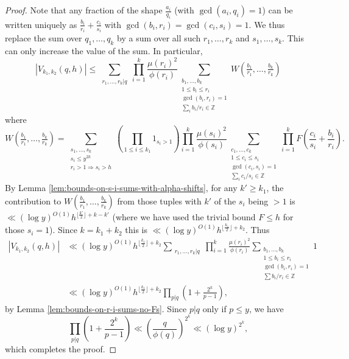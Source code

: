 \documentclass[11pt,letterpaper]{amsart}
\newcommand{\brac}[1]{\left( #1\right)}
\newcommand{\subsum}[1]{\sum_{\substack{#1}}}
\newcommand{\ogcd}[2]{\gcd(#1,#2)}
\theoremstyle{definition}
\begin{document}
\begin{proof}
Note that any fraction of the shape $\frac{a_i}{q_i}$ (with $\ogcd{a_i}{q_i}=1$) can be written uniquely as $\frac{b_i}{r_i}+\frac{c_i}{s_i}$ with $\ogcd{b_i}{r_i}=\ogcd{c_i}{s_i}=1$. We thus replace the sum over $q_1, \dots, q_k$ by a sum over all such $r_1, \dots, r_k$ and $s_1, \dots, s_k$. This can only increase the value of the sum. In particular,
\[|V_{k_1,k_2}(q,h)| \le \subsum{r_1, \dots, r_k|q} \prod_{i=1}^k \frac{\mu(r_i)^2}{\phi(r_i)}\subsum{b_1, \dots, b_k \\ 1 \le b_i \le r_i \\ \ogcd{b_i}{r_i} = 1\\ \sum_i b_i/r_i \in \mathbb Z} W(\tfrac{b_1}{r_1},\ldots,\tfrac{b_k}{r_k})\]
where
\[W(\tfrac{b_1}{r_1},\ldots,\tfrac{b_k}{r_k})=\subsum{s_1, \dots, s_k \\ s_i \leq y^{2k}\\ r_i>1\Rightarrow s_i>h} \brac{\prod_{1\leq i\leq k_1}1_{s_i>1}}\prod_{i=1}^k \frac{\mu(s_i)^2}{\phi(s_i)}\subsum{c_1, \dots, c_k \\ 1 \le c_i \le s_i \\ \ogcd{c_i}{s_i} = 1 \\ \sum_i c_i/s_i \in \mathbb Z} \prod_{i=1}^k F\left(\frac{c_i}{s_i} + \frac{b_i}{r_i}\right).\]
By Lemma \ref{lem:bounds-on-s-i-sums-with-alpha-shifts}, for any $k' \ge k_1$, the contribution to $W(\tfrac{b_1}{r_1},\ldots,\tfrac{b_k}{r_k})$ from those tuples with $k'$ of the $s_i$ being $>1$ is $\ll (\log y)^{O(1)}h^{\lfloor \frac{k'}{2}\rfloor+k-k'}$ (where we have used the trivial bound $F\leq h$ for those $s_i=1$). Since $k=k_1+k_2$ this is $\ll (\log y)^{O(1)}h^{\lfloor \frac{k_1}{2}\rfloor+k_2}$. Thus
\begin{align*}
|V_{k_1,k_2}(q,h)| &\ll (\log y)^{O(1)} h^{\lfloor \frac{k_1}{2}\rfloor+k_2}\subsum{r_1, \dots, r_k|q} \prod_{i=1}^k \frac{\mu(r_i)^2}{\phi(r_i)}\subsum{b_1, \dots, b_k \\ 1 \le b_i \le r_i \\ \ogcd{b_i}{r_i} = 1\\ \sum b_i/r_i \in \mathbb Z} 1 \\
&\ll (\log y)^{O(1)}h^{\lfloor \frac{k_1}{2}\rfloor+k_2}\prod_{p|q}\left(1 + \frac{2^k}{p-1}\right),
\end{align*}
by Lemma \ref{lem:bounds-on-r-i-sums-no-Fs}. Since $p|q$ only if $p \le y$, we have
\begin{equation*}
\prod_{p|q} \left(1 + \frac{2^k}{p-1}\right) \ll \left(\frac{q}{\phi(q)}\right)^{2^k} \ll (\log y)^{2^k},
\end{equation*}
which completes the proof.
\end{proof}
\end{document}
